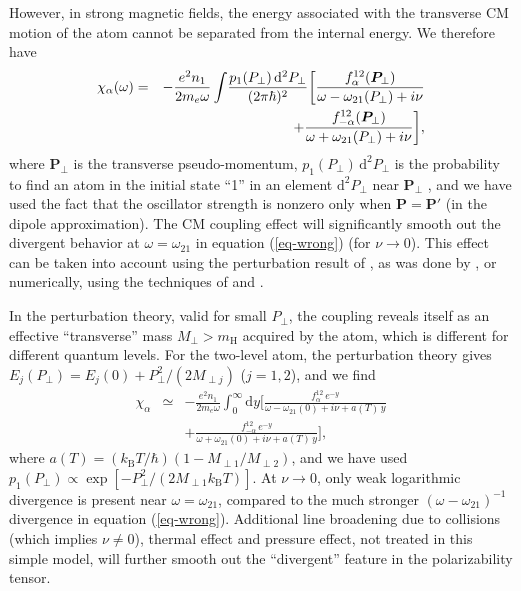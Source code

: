 \documentclass{emulateapj}
\newcommand{\req}[1]{equation (\ref{#1})}
\newcommand{\dd}{\mathrm{d}}
\newcommand{\kB}{k_\mathrm{B}}
\newcommand{\mel}{m_e}
\newcommand{\bP}{\bm{P}}
\newcommand{\mH}{m_\mathrm{H}}
\begin{document}
However, in strong magnetic fields, the energy associated with the transverse
CM motion of the atom cannot be separated from the internal energy.
We therefore have 
\begin{eqnarray}
\chi_\alpha(\omega) &=& -{e^2 n_1\over 2m_e\omega}\int\!
{p_1(P_\perp)\,\dd^2 P_\perp\over (2\pi\hbar)^2}
\bigg[
\frac{f_\alpha^{12}(\bP_\perp)}{\omega-\omega_{21}(P_\perp)+i\nu}
 \nonumber\\&&
+\frac{f_{-\alpha}^{12}(\bP_\perp)}{\omega+\omega_{21}(P_\perp)+i\nu}
\bigg] ,
\end{eqnarray}
where $\bP_\perp$ is the transverse pseudo-momentum, 
$p_1(P_\perp)\,\dd^2 P_\perp$ is the probability to find an atom
in the initial state ``1'' in an element $\dd^2 P_\perp$ near $\bP_\perp$
\citep[see][]{PCS99},
and we have 
used the fact that the oscillator strength is nonzero only when
$\bP=\bP'$ (in the dipole approximation). 
The CM coupling effect will significantly smooth out the
divergent behavior at $\omega=\omega_{21}$ in \req{eq-wrong}
(for $\nu\rightarrow 0$). 
This effect can be taken into account
using the perturbation result of \citet{PM93}, as was done
by \citet{BulikPavlov}, or numerically, using the techniques
of \citet{PP95} and \cite{PP97}.

In the perturbation theory, valid for small $P_\perp$,
the coupling reveals itself as an effective ``transverse'' mass 
$M_\perp > \mH$
acquired by the atom, which is different for different quantum levels. 
For the two-level atom,
the perturbation theory gives
$E_j(P_\perp)=E_j(0)+P_\perp^2/(2M_{\perp j})$ ($j=1,2$), and we find
\begin{eqnarray}
\chi_\alpha &\simeq& -\frac{e^2 n_1}{2\mel\omega}
\int_0^\infty\! \dd y \bigg[
\frac{f_\alpha^{12}\,e^{-y}}{\omega-\omega_{21}(0)+i\nu+a(T)\,y}
 \nonumber\\&&
+
\frac{f_{-\alpha}^{12}\,e^{-y}}{\omega+\omega_{21}(0)+i\nu+a(T)\,y}
\bigg] ,
\end{eqnarray}
where
$a(T)=
(\kB T/\hbar)(1-M_{\perp 1}/M_{\perp 2})$,
and we have used $p_1(P_\perp)\propto 
\exp[-P_\perp^2/(2M_{\perp 1} \kB T)]$.
At $\nu\to0$, only weak logarithmic divergence is present near 
$\omega=\omega_{21}$, compared to the much stronger 
$(\omega-\omega_{21})^{-1}$ divergence in \req{eq-wrong}.
Additional line broadening due to collisions 
(which implies $\nu\neq0$),
thermal
effect and pressure effect, not treated in this simple model, will 
further smooth out the ``divergent'' feature in the polarizability tensor. 
\end{document}
